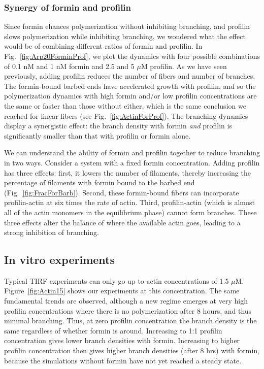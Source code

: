 \documentclass[11pt]{article}
\begin{document}
\subsubsection{Synergy of formin and profilin}
Since formin ehances polymerization without inhibiting branching, and profilin slows polymerization while inhibiting branching, we wondered what the effect would be of combining different ratios of formin and profilin. In Fig.\ \ref{fig:Arp20ForminProf}, we plot the dynamics with four possible combinations of 0.1 nM and 1 nM formin and 2.5 and 5 $\mu$M profilin. As we have seen previously, adding profilin reduces the number of fibers and number of branches. The formin-bound barbed ends have accelerated growth with profilin, and so the polymerization dynamics with high formin and/or low profilin concentrations are the same or faster than those without either, which is the same conclusion we reached for linear fibers (see Fig.\ \ref{fig:ActinForProf}). The branching dynamics display a synergistic effect: the branch density with formin \emph{and} profilin is significantly smaller than that with profilin or formin alone. 

We can understand the ability of formin and profilin together to reduce branching in two ways. Consider a system with a fixed formin concentration. Adding profilin has three effects: first, it lowers the number of filaments, thereby increasing the percentage of filaments with formin bound to the barbed end (Fig.\ \ref{fig:FracForBarb}). Second, these formin-bound fibers can incorporate profilin-actin at six times the rate of actin. Third, profilin-actin (which is almost all of the actin monomers in the equilibrium phase) cannot form branches. These three effects alter the balance of where the available actin goes, leading to a strong inhibition of branching. 

\subsection{In vitro experiments}
Typical TIRF experiments can only go up to actin concentrations of 1.5 $\mu$M. Figure\ \ref{fig:Actin15} shows our experiments at this concentration. The same fundamental trends are observed, although a new regime emerges at very high profilin concentrations where there is no polymerization after 8 hours, and thus minimal branching. Thus, at zero profilin concentration the branch density is the same regardless of whether formin is around. Increasing to 1:1 profilin concentration gives lower branch densities with formin. Increasing to higher profilin concentration then gives higher branch densities (after 8 hrs) with formin, because the simulations without formin have not yet reached a steady state.
\end{document}
